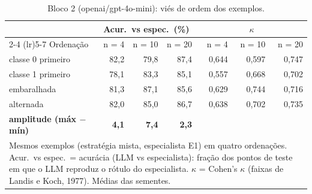\begin{table}[htbp]
\centering
\small
\caption{Bloco 2 (openai/gpt-4o-mini): viés de ordem dos exemplos.}
\label{tab:bloco2_E1_ordem_exemplos_gpt4mini}
\begin{tabular}{lrrrrrr}
\toprule
 & \multicolumn{3}{c}{Acur.\ vs espec.\ (\%)} & \multicolumn{3}{c}{$\kappa$} \\ \cmidrule(lr){2-4} \cmidrule(lr){5-7}
Ordenação & n = 4 & n = 10 & n = 20 & n = 4 & n = 10 & n = 20 \\
\midrule
classe 0 primeiro & 82,2 & 79,8 & 87,4 & 0,644 & 0,597 & 0,747 \\
classe 1 primeiro & 78,1 & 83,3 & 85,1 & 0,557 & 0,668 & 0,702 \\
embaralhada & 81,3 & 87,1 & 85,6 & 0,629 & 0,744 & 0,716 \\
alternada & 82,0 & 85,0 & 86,7 & 0,638 & 0,702 & 0,735 \\
\midrule
\textbf{amplitude (máx $-$ mín)} & \textbf{4,1} & \textbf{7,4} & \textbf{2,3} &  &  &  \\
\bottomrule
\multicolumn{7}{p{0.95\linewidth}}{\footnotesize Mesmos exemplos (estratégia mista, especialista E1) em quatro ordenações. Acur.\ vs espec.\ = acurácia (LLM vs especialista): fração dos pontos de teste em que o LLM reproduz o rótulo do especialista. $\kappa$ = Cohen's $\kappa$ (faixas de Landis e Koch, 1977). Médias das sementes.} \\
\end{tabular}
\end{table}
